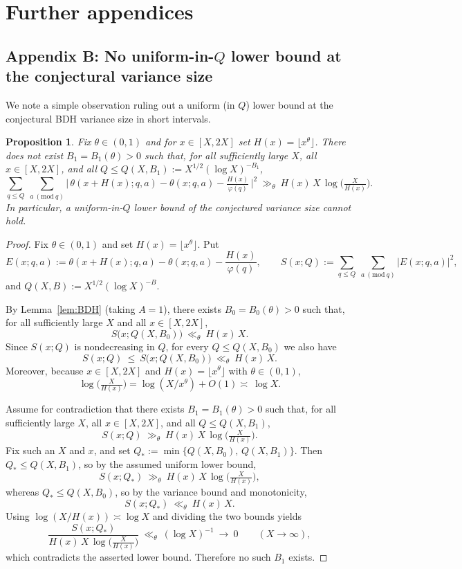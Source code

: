 \documentclass[11pt]{amsart}
\newtheorem{proposition}[theorem]{Proposition}
\theoremstyle{definition}
\theoremstyle{remark}
\numberwithin{equation}{section}
\begin{document}
\section{Further appendices}

\subsection*{Appendix B: No uniform-in-$Q$ lower bound at the conjectural variance size}
We note a simple observation ruling out a uniform (in $Q$) lower bound at the conjectural BDH variance size in short intervals.

\begin{proposition}\label{prop:no-uniform-Q}
Fix $\theta\in(0,1)$ and for $x\in[X,2X]$ set $H(x)=\lfloor x^\theta\rfloor$. There does not exist $B_1=B_1(\theta)>0$ such that, for all sufficiently large $X$, all $x\in[X,2X]$, and all $Q\le Q(X,B_1):=X^{1/2}(\log X)^{-B_1}$,
\[
\sum_{q\le Q}\ \sum_{a\ (\mathrm{mod}\ q)} \Big|\,\theta(x+H(x);q,a)-\theta(x;q,a)-\tfrac{H(x)}{\varphi(q)}\,\Big|^2\ \gg_{\theta}\ H(x)\,X\,\log\!\Big(\tfrac{X}{H(x)}\Big).
\]
In particular, a uniform-in-$Q$ lower bound of the conjectured variance size cannot hold.
\end{proposition}

\begin{proof}
Fix $\theta\in(0,1)$ and set $H(x)=\lfloor x^\theta\rfloor$. Put
\[
E(x;q,a):=\theta(x+H(x);q,a)-\theta(x;q,a)-\frac{H(x)}{\varphi(q)},\qquad
S(x;Q):=\sum_{q\le Q}\ \sum_{a\ (\mathrm{mod}\ q)} |E(x;q,a)|^2,
\]
and $Q(X,B):=X^{1/2}(\log X)^{-B}$.

By Lemma~\ref{lem:BDH} (taking $A=1$), there exists $B_0=B_0(\theta)>0$ such that, for all sufficiently large $X$ and all $x\in[X,2X]$,
\[
S\big(x;Q(X,B_0)\big)\ \ll_{\theta}\ H(x)\,X.
\]
Since $S(x;Q)$ is nondecreasing in $Q$, for every $Q\le Q(X,B_0)$ we also have
\[
S(x;Q)\ \le\ S\big(x;Q(X,B_0)\big)\ \ll_{\theta}\ H(x)\,X.
\]
Moreover, because $x\in[X,2X]$ and $H(x)=\lfloor x^\theta\rfloor$ with $\theta\in(0,1)$,
\[
\log\!\Big(\tfrac{X}{H(x)}\Big)=\log(X/x^\theta)+O(1)\asymp\ \log X.
\]

Assume for contradiction that there exists $B_1=B_1(\theta)>0$ such that, for all sufficiently large $X$, all $x\in[X,2X]$, and all $Q\le Q(X,B_1)$,
\[
S(x;Q)\ \gg_{\theta}\ H(x)\,X\,\log\!\Big(\tfrac{X}{H(x)}\Big).
\]
Fix such an $X$ and $x$, and set $Q_*:=\min\{Q(X,B_0),\,Q(X,B_1)\}$. Then $Q_*\le Q(X,B_1)$, so by the assumed uniform lower bound,
\[
S(x;Q_*)\ \gg_{\theta}\ H(x)\,X\,\log\!\Big(\tfrac{X}{H(x)}\Big),
\]
whereas $Q_*\le Q(X,B_0)$, so by the variance bound and monotonicity,
\[
S(x;Q_*)\ \ll_{\theta}\ H(x)\,X.
\]
Using $\log(X/H(x))\asymp\log X$ and dividing the two bounds yields
\[
\frac{S(x;Q_*)}{H(x)\,X\,\log\!\big(\tfrac{X}{H(x)}\big)}\ \ll_{\theta}\ (\log X)^{-1}\ \to\ 0\qquad (X\to\infty),
\]
which contradicts the asserted lower bound. Therefore no such $B_1$ exists.
\end{proof}
\end{document}
